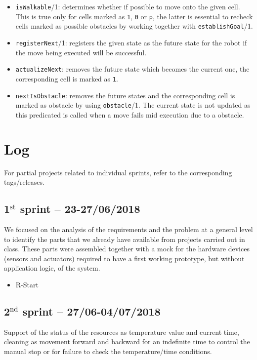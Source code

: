 \begin{itemize}
	\item \texttt{isWalkable}/1: determines whether if possible to move onto the given cell. This is true only for cells marked as \texttt{1}, \texttt{0} or \texttt{p}, the latter is essential to recheck cells marked as possible obstacles by working together with \texttt{establishGoal}/1.
	\item \texttt{registerNext}/1: registers the given state as the future state for the robot if the move being executed will be successful.
	\item \texttt{actualizeNext}: removes the future state which becomes the current one, the corresponding cell is marked as \texttt{1}.
	\item \texttt{nextIsObstacle}: removes the future states and the corresponding cell is marked as obstacle by using \texttt{obstacle}/1. The current state is not updated as this predicated is called when a move fails mid execution due to a obstacle.
\end{itemize}

\section{Log}

For partial projects related to individual sprints, refer to the corresponding tags/releases.

\subsection{1$^{\textrm{st}}$ sprint -- 23-27/06/2018}
We focused on the analysis of the requirements and the problem at a general level to identify the parts that we already have available from projects carried out in class. These parts were assembled together with a mock for the hardware devices (sensors and actuators) required to have a first working prototype, but without application logic, of the system.

\begin{itemize}
	\ttfamily
	\item R-Start
\end{itemize}

\subsection{2$^{\textrm{nd}}$ sprint -- 27/06-04/07/2018}
Support of the status of the resources as temperature value and current time, cleaning as movement forward and backward for an indefinite time to control the manual stop or for failure to check the temperature/time conditions.

